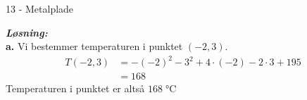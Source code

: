 \documentclass{article}
\newcommand{\sol}{\setlength{\parindent}{0cm}\textbf{\textit{Løsning:}}\setlength{\parindent}{1cm}}
\begin{document}
\begin{question*}{13 - Metalplade}{}

\end{question*}
\sol \\
\textbf{a.}
Vi bestemmer temperaturen i punktet $(-2,3)$.
\begin{equation*}
\begin{split}
  T(-2,3)&=-(-2)^2-3^2+4 \cdot \left( -2\right) -2 \cdot 3 +195 \\
  &=168
\end{split}
\end{equation*}
Temperaturen i punktet er altså $168\;\unit{\celsius} $
\end{document}
